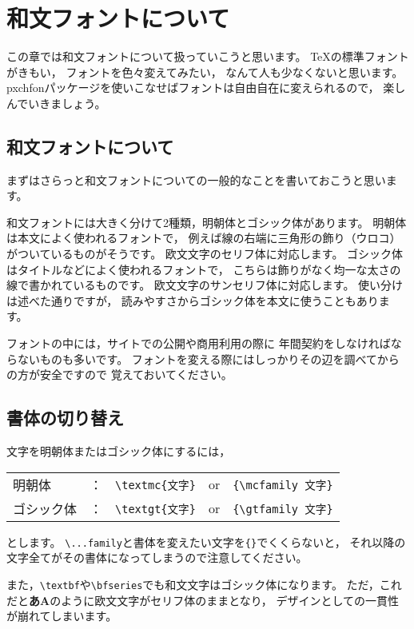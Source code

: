 \chapter{和文フォントについて}

この章では和文フォントについて扱っていこうと思います。
{\TeX}の標準フォントがきもい，
フォントを色々変えてみたい，
なんて人も少なくないと思います。
pxchfonパッケージを使いこなせばフォントは自由自在に変えられるので，
楽しんでいきましょう。



\section{和文フォントについて}
まずはさらっと和文フォントについての一般的なことを書いておこうと思います。

和文フォントには大きく分けて2種類，明朝体とゴシック体があります。
明朝体は本文によく使われるフォントで，
例えば線の右端に三角形の飾り（ウロコ）がついているものがそうです。
欧文文字のセリフ体に対応します。
ゴシック体はタイトルなどによく使われるフォントで，
こちらは飾りがなく均一な太さの線で書かれているものです。
欧文文字のサンセリフ体に対応します。
使い分けは述べた通りですが，
読みやすさからゴシック体を本文に使うこともあります。

フォントの中には，サイトでの公開や商用利用の際に
年間契約をしなければならないものも多いです。
フォントを変える際にはしっかりその辺を調べてからの方が安全ですので
覚えておいてください。



\section{書体の切り替え}
文字を明朝体またはゴシック体にするには，

\begin{tabular}{lclcl}
明朝体 & ： & \verb|\textmc{文字}| & or & \verb|{\mcfamily 文字}| \\
ゴシック体 & ： & \verb|\textgt{文字}| & or & \verb|{\gtfamily 文字}|
\end{tabular}

とします。
\verb|\...family|と書体を変えたい文字を\verb|{}|でくくらないと，
それ以降の文字全てがその書体になってしまうので注意してください。

また，\verb|\textbf|や\verb|\bfseries|でも和文文字はゴシック体になります。
ただ，これだと\textbf{あA}のように欧文文字がセリフ体のままとなり，
デザインとしての一貫性が崩れてしまいます。

